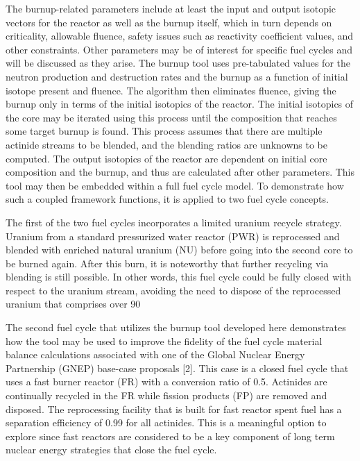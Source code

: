 The burnup-related parameters include at least the input and output isotopic vectors for the reactor as well as the burnup itself, which in turn depends on criticality, allowable fluence, safety issues such as reactivity coefficient values, and other constraints.  Other parameters may be of interest for specific fuel cycles and will be discussed as they arise.  The burnup tool uses pre-tabulated values for the neutron production and destruction rates and the burnup as a function of initial isotope present and fluence.  The algorithm then eliminates fluence, giving the burnup only in terms of the initial isotopics of the reactor.  The initial isotopics of the core may be iterated using this process until the composition that reaches some target burnup is found.  This process assumes that there are multiple actinide streams to be blended, and the blending ratios are unknowns to be computed.  The output isotopics of the reactor are dependent on initial core composition and the burnup, and thus are calculated after other parameters.   This tool may then be embedded within a full fuel cycle model.  To demonstrate how such a coupled framework functions, it is applied to two fuel cycle concepts.  

The first of the two fuel cycles incorporates a limited uranium recycle strategy.   Uranium from a standard pressurized water reactor (PWR) is reprocessed and blended with enriched natural uranium (NU) before going into the second core to be burned again.  After this burn, it is noteworthy that further recycling via blending is still possible.  In other words, this fuel cycle could be fully closed with respect to the uranium stream, avoiding the need to dispose of the reprocessed uranium that comprises over 90%

The second fuel cycle that utilizes the burnup tool developed here demonstrates how the tool may be used to improve the fidelity of the fuel cycle material balance calculations associated with one of the Global Nuclear Energy Partnership (GNEP) base-case proposals [2].  This case is a closed fuel cycle that uses a fast burner reactor (FR) with a conversion ratio of 0.5.  Actinides are continually recycled in the FR while fission products (FP) are removed and disposed.  The reprocessing facility that is built for fast reactor spent fuel has a separation efficiency of 0.99 for all actinides.  This is a meaningful option to explore since fast reactors are considered to be a key component of long term nuclear energy strategies that close the fuel cycle.

